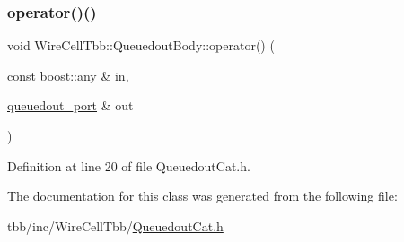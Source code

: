 \subsubsection{\texorpdfstring{operator()()}{operator()()}}
{\footnotesize\ttfamily void Wire\+Cell\+Tbb\+::\+Queuedout\+Body\+::operator() (\begin{DoxyParamCaption}\item[{const boost\+::any \&}]{in,  }\item[{\hyperlink{namespace_wire_cell_tbb_a1812565243cb4597d2215ad672e1e991}{queuedout\+\_\+port} \&}]{out }\end{DoxyParamCaption})\hspace{0.3cm}{\ttfamily [inline]}}



Definition at line 20 of file Queuedout\+Cat.\+h.



The documentation for this class was generated from the following file\+:\begin{DoxyCompactItemize}
\item 
tbb/inc/\+Wire\+Cell\+Tbb/\hyperlink{_queuedout_cat_8h}{Queuedout\+Cat.\+h}\end{DoxyCompactItemize}
